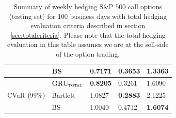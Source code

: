 \documentclass[letterpaper,12pt,titlepage,oneside,final]{book}
\numberwithin{equation}{section}
\theoremstyle{definition}
\newcommand{\modelT}{\textsc{GRU}_{\textsc{total}}}
\begin{document}
\begin{table}[htp!]
\begin{tabular}{ll|l|l|l|}
		\multicolumn{1}{|l|}{}                                & BS       & 0.7171          & 0.3653          & \textbf{1.3363} \\ \hline
		\multicolumn{1}{|l|}{\multirow{3}{*}{CVaR (99\%)}}    & $\modelT$    & \textbf{0.8205}          & 0.3261 & 1.6090          \\  
		\multicolumn{1}{|l|}{}                                & Bartlett & 1.0827          & \textbf{0.2883}          & 2.1225          \\  
		\multicolumn{1}{|l|}{}                                & BS       & 1.0040          & 0.4712          & \textbf{1.6074} \\ \hline
	\end{tabular}
	\caption{Summary of weekly hedging S\&P 500 call options (testing set) for 100 business days with total hedging evaluation criteria described in  section \ref{sec:totalcriteria}. Please note that the total hedging evaluation in this table assumes we are at the sell-side of the option trading.} \label{table:CallTotalW}
\end{table}
\end{document}

